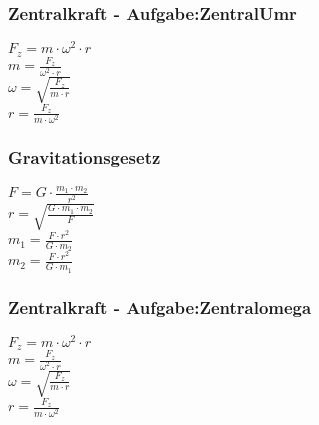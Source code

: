 \subsubsection{Zentralkraft - Aufgabe:ZentralUmr} 
\begin{minipage}{0.45\textwidth} 
$ F_{z}  = m\cdot \omega ^{2} \cdot r $\\ 
$ m = \frac{ F_{z} }{\omega ^{2} \cdot r} $\\ 
$ \omega  = \sqrt{\frac{ F_{z} }{m\cdot r}} $\\ 
$ r = \frac{ F_{z} }{m\cdot \omega ^{2} } $\\ 
\end{minipage} 
\begin{minipage}{0.45\textwidth} 
 
\end{minipage} 
\subsubsection{Gravitationsgesetz} 
\begin{minipage}{0.45\textwidth} 
$ F = G \cdot  \frac{m_{1} \cdot m_{2} }{  r^{2} } $\\ 
$ r = \sqrt{\frac{G\cdot m_{1} \cdot m_{2} }{   F}} $\\ 
$ m_{1}  =  \frac{F\cdot r^{2} }{G\cdot m_{2} } $\\ 
$ m_{2}  =  \frac{F\cdot r^{2} }{G\cdot m_{1} } $\\ 
\end{minipage} 
\begin{minipage}{0.45\textwidth} 
 
\end{minipage} 
\subsubsection{Zentralkraft - Aufgabe:Zentralomega} 
\begin{minipage}{0.45\textwidth} 
$ F_{z}  = m\cdot \omega ^{2} \cdot r $\\ 
$ m = \frac{ F_{z} }{\omega ^{2} \cdot r} $\\ 
$ \omega  = \sqrt{\frac{ F_{z} }{m\cdot r}} $\\ 
$ r = \frac{ F_{z} }{m\cdot \omega ^{2} } $\\ 
\end{minipage} 
\begin{minipage}{0.45\textwidth} 
 
\end{minipage} 
